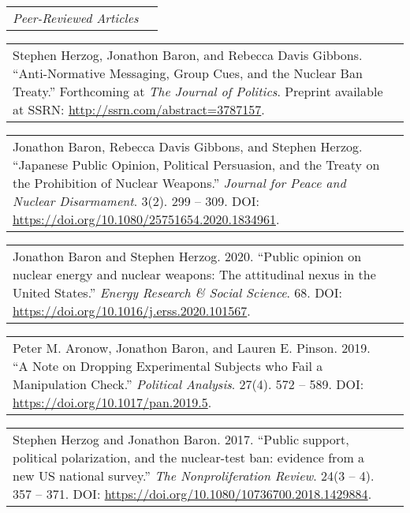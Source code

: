 \documentclass[11pt]{article}
\begin{document}
\vspace{0.13in}

\begin{tabular*}{7.1in}{p{6.925in}p{3cm}}
{\large {\emph{Peer-Reviewed Articles}}}
\end{tabular*} 

\vspace{0.13in}

\begin{tabular*}{7.1in}{p{6.925in}p{3cm}}
Stephen Herzog, Jonathon Baron, and Rebecca Davis Gibbons. ``Anti-Normative Messaging, Group Cues, and the Nuclear Ban Treaty.'' Forthcoming at \textit{The Journal of Politics}. Preprint available at SSRN: \url{http://ssrn.com/abstract=3787157}.
\end{tabular*}

\vspace{0.13in}

\begin{tabular*}{7.1in}{p{6.925in}p{3cm}}
Jonathon Baron, Rebecca Davis Gibbons, and Stephen Herzog. ``Japanese Public Opinion, Political Persuasion, and the Treaty on the Prohibition of Nuclear Weapons.'' \textit{Journal for Peace and Nuclear Disarmament}. 3(2). 299 -- 309. DOI: \url{https://doi.org/10.1080/25751654.2020.1834961}.
\end{tabular*}

\vspace{0.13in}

\begin{tabular*}{7.1in}{p{6.925in}p{3cm}}
Jonathon Baron and Stephen Herzog. 2020. ``Public opinion on nuclear energy and nuclear weapons: The attitudinal nexus in the United States.'' \textit{Energy Research \& Social Science}. 68. DOI: \url{https://doi.org/10.1016/j.erss.2020.101567}.
\end{tabular*}

\vspace{0.13in}

\begin{tabular*}{7.1in}{p{6.925in}p{3cm}}
Peter M. Aronow, Jonathon Baron, and Lauren E. Pinson. 2019. ``A Note on Dropping Experimental Subjects who Fail a Manipulation Check.'' \textit{Political Analysis}. 27(4). 572 -- 589. DOI: \url{https://doi.org/10.1017/pan.2019.5}.
\end{tabular*}

\vspace{0.13in}

\begin{tabular*}{7.1in}{p{6.925in}p{3cm}}
Stephen Herzog and Jonathon Baron. 2017. ``Public support, political polarization, and the nuclear-test ban: evidence from a new US national survey.'' {\it The Nonproliferation Review}. 24(3 -- 4). 357 -- 371. DOI: \url{https://doi.org/10.1080/10736700.2018.1429884}.
\end{tabular*}
\end{document}
